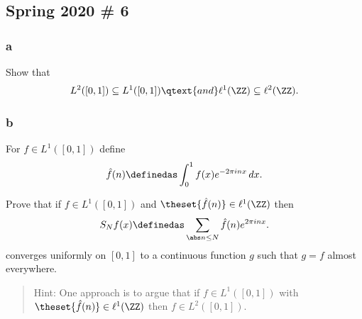 \hypertarget{spring-2020-6}{%
\subsection{Spring 2020 \# 6}\label{spring-2020-6}}

\hypertarget{a-16}{%
\subsubsection{a}\label{a-16}}

Show that
\begin{align*}
L^2([0, 1]) \subseteq L^1([0, 1]) \qtext{and} \ell^1(\ZZ) \subseteq \ell^2(\ZZ)
.\end{align*}

\hypertarget{b-16}{%
\subsubsection{b}\label{b-16}}

For \(f\in L^1([0, 1])\) define
\begin{align*}
\hat{f}(n) \definedas \int _0^1 f(x) e^{-2\pi i n x} \, dx
.\end{align*}

Prove that if \(f\in L^1([0, 1])\) and
\(\theset{\hat f(n)} \in \ell^1(\ZZ)\) then
\begin{align*}
S_N f(x) \definedas \sum_{\abs n \leq N} \hat f (n) e^{2 \pi i n x}
.\end{align*} converges uniformly on \([0, 1]\) to a continuous function
\(g\) such that \(g = f\) almost everywhere.

\begin{quote}
Hint: One approach is to argue that if \(f\in L^1([0, 1])\) with
\(\theset{\hat f (n)} \in \ell^1(\ZZ)\) then \(f\in L^2([0, 1])\).
\end{quote}

